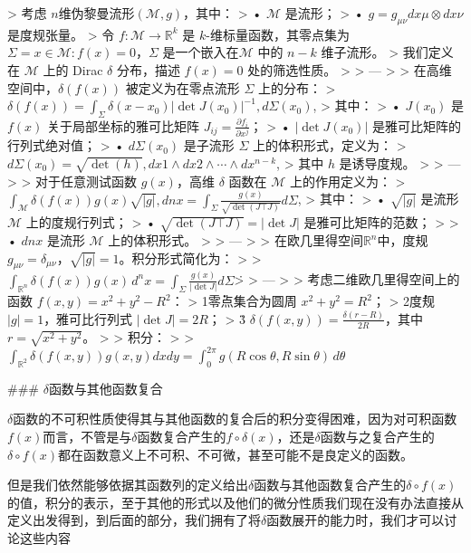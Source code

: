 \documentclass[lang=cn,10pt,newtx,bibend=biber,device=pad]{elegantbook}
\begin{document}
> 考虑 $n$维伪黎曼流形$(\mathcal{M}, g)$，其中：  
> 	•	$\mathcal{M}$ 是流形；  
> 	•	$g = g_{\mu\nu} dx\mu \otimes dx\nu$ 是度规张量。  
> 令 $f: \mathcal{M} \to \mathbb{R}^k$ 是 $k$-维标量函数，其零点集为 $\Sigma = {x \in \mathcal{M} : f(x) = 0}$，$\Sigma$ 是一个嵌入在$\mathcal{M}$ 中的 $n-k$ 维子流形。  
> 我们定义在 $\mathcal{M}$ 上的 Dirac $\delta$ 分布，描述 $f(x) = 0$ 处的筛选性质。
>
> ---
>
> 在高维空间中，$\delta(f(x))$ 被定义为在零点流形 $\Sigma$ 上的分布：  
> ​$\delta(f(x)) = \int_{\Sigma} \delta(x - x_0) |\det J(x_0)|^{-1} , d\Sigma(x_0)$,  
> 其中：  
> 	•	$J(x_0)$ 是 $f(x)$ 关于局部坐标的雅可比矩阵 $J_{ij} = \frac{\partial f_i}{\partial x^j}$；  
> 	•	$|\det J(x_0)|$ 是雅可比矩阵的行列式绝对值；  
> 	•	$d\Sigma(x_0)$ 是子流形 $\Sigma$ 上的体积形式，定义为：  
> ​$d\Sigma(x_0) = \sqrt{\det (h)} , dx1 \wedge dx2 \wedge \cdots \wedge dx^{n-k}$,  
> 其中 $h$ 是诱导度规。
>
> ---
>
> 对于任意测试函数 $g(x)$，高维 $\delta$ 函数在 $\mathcal{M}$ 上的作用定义为：  
> $\int_{\mathcal{M}} \delta(f(x)) g(x) \sqrt{|g|} , dn x = \int_\Sigma \frac{g(x)}{\sqrt{\det (J\top J)}} d\Sigma$,  
> 其中：  
> 	•	$\sqrt{|g|}$ 是流形 $\mathcal{M}$ 上的度规行列式；  
> 	•	$\sqrt{\det (J\top J)} = |\det J|$ 是雅可比矩阵的范数；
>
> 	•	$dn x$ 是流形 $\mathcal{M}$ 上的体积形式。
>
> ---
>
> 在欧几里得空间$\mathbb{R}^n$中，度规 $g_{\mu\nu} = \delta_{\mu\nu}$，$\sqrt{|g|} = 1$。积分形式简化为：
>
> $\int_{\mathbb{R}^n} \delta(f(x)) g(x) \, d^n x = \int_\Sigma \frac{g(x)}{|\det J|} d\Sigma$\.
>
> ---
>
> 考虑二维欧几里得空间上的函数 $f(x, y) = x^2 + y^2 - R^2$：  
> 	1\.	零点集合为圆周 $x^2 + y^2 = R^2$；  
> 	2\.	度规 $|g| = 1$，雅可比行列式 $|\det J| = 2R$；  
> 	3\.	$\delta(f(x, y)) = \frac{\delta(r-R)}{2R}$，其中 $r = \sqrt{x^2 + y^2}$。
>
> 积分：
>
> $\int_{\mathbb{R}^2} \delta(f(x, y)) g(x, y) dx dy = \int_0^{2\pi} g(R \cos\theta, R \sin\theta) \, d\theta$\.

‍

### $\delta$函数与其他函数复合

$\delta$函数的不可积性质使得其与其他函数的复合后的积分变得困难，因为对可积函数$f(x)$而言，不管是与$\delta$函数复合产生的$f\circ\delta(x)$，还是$\delta$函数与之复合产生的$\delta\circ f(x)$都在函数意义上不可积、不可微，甚至可能不是良定义的函数。

但是我们依然能够依据其函数列的定义给出$\delta$函数与其他函数复合产生的$\delta\circ f(x)$的值，积分的表示，至于其他的形式以及他们的微分性质我们现在没有办法直接从定义出发得到，到后面的部分，我们拥有了将$\delta$函数展开的能力时，我们才可以讨论这些内容
\end{document}
